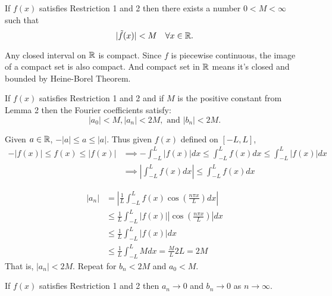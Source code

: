 \documentclass[class=article,crop=false]{standalone}
\begin{document}
\begin{lem}[2]
	If $f(x)$ satisfies Restriction 1 and 2 then there exists a number  $0<M<\infty$ such that 
	\[
		|\tilde{ f } (x)|< M \quad \forall x \in \mathbb{R}
	.\] 
\end{lem}
\begin{prf}
Any closed interval on $\mathbb{R}$ is compact. Since $f$ is piecewise continuous, the image of a compact set is also compact. And compact set in $\mathbb{R}$ means it's closed and bounded by Heine-Borel Theorem.
\end{prf}

\begin{lem}[3]
	If $f(x)$ satisfies Restriction 1 and 2 and if  $M$ is the positive constant from Lemma 2 then the Fourier coefficients satisfy:
	 \[
	|a_0|<M, |a_n|<2M, \text{ and } |b_n|<2M
	.\] 
\end{lem}
\begin{prf}
	Given $a \in \mathbb{R}$, $-|a|\leq a \leq |a|$. Thus given  $f(x)$ defined on  $[-L,L]$,
	 \begin{align*}
		 -|f(x)| \leq f(x) \leq |f(x)| &\implies  - \int_{-L}^{L} |f(x)| dx \leq \int_{-L}^{L} f(x)  dx \leq \int_{-L}^{L} |f(x) | dx\\
					       & \implies \left|\int_{-L}^{L} f(x)dx \right| \leq \int_{-L}^{L} f(x) dx 
	\end{align*}

	\begin{align*}
		|a_n| &= \left| \frac{1}{L} \int_{-L}^{L} f(x) \cos \left( \frac{ n\pi x}{ L } \right) dx  \right|  \\
		      &\leq \frac{1}{L} \int_{-L}^{L} |f(x)| \left| \cos \left( \frac{ n\pi x}{ L } \right)  \right| dx   \\
		      &\leq \frac{1}{L} \int_{-L}^{L} |f(x)|dx \\
		      &\leq \frac{1}{L} \int_{-L}^{L} M dx = \frac{M}{L}2L = 2M  
	\end{align*}
	That is, $|a_n|<2M$. Repeat for $b_n<2M$ and $a_0<M$.
\end{prf}

\begin{lem}
	If $f(x)$ satisfies Restriction 1 and 2 then  $a_n \to 0$ and $b_n \to 0$ as $n \to \infty $.
\end{lem}
\end{document}
